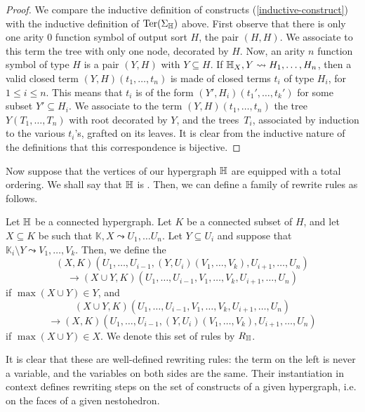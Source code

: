 \begin{proof}
  We compare the inductive definition of constructs (\cref{inductive-construct}) with the inductive definition of $\operatorname{Ter}(\Sigma_{\mathbb H})$ above.
  First observe that there is only one arity $0$ function symbol of output sort $H$, the pair $(H,H)$. 
  We associate to this term the tree with only one node, decorated by $H$.
  Now, an arity $n$ function symbol of type $H$ is a pair $(Y,H)$ with $Y \subseteq H$. 
  If ${\mathbb H}_X,Y \leadsto H_1,\ldots,H_n$, then a valid closed term $(Y,H)(t_1,\ldots,t_n)$ is made of closed terms $t_i$ of type $H_i$, for $1 \leq i \leq n$. 
  This means that $t_i$ is of the form $(Y',H_i)(t_1',\ldots,t_k')$ for some subset $Y' \subseteq H_i$. 
  We associate to the term $(Y,H)(t_1,\ldots,t_n)$ the tree $Y(T_1,\ldots,T_n)$ with root decorated by $Y$, and the trees~$T_i$, associated by induction to the various $t_i$'s, grafted on its leaves.
  It is clear from the inductive nature of the definitions that this correspondence is bijective.
\end{proof}

Now suppose that the vertices of our hypergraph ${\mathbb H}$ are equipped with a total ordering.
We shall say that ${\mathbb H}$ is .
Then, we can define a family of rewrite rules as follows.

\begin{definition} \label{def:rules}
  Let ${\mathbb H}$ be a connected hypergraph. 
  Let $K$ be a connected subset of $H$, and let $X \subseteq K$ be such that $\mathbb{K},X \leadsto U_1,\ldots U_n$.
  Let $Y \subseteq U_i$ and suppose that $\mathbb{K}_i\setminus Y \leadsto V_1,\ldots, V_k$. 
  Then, we define the 
  $$(X,K)(U_1,\ldots, U_{i-1},(Y,U_i)(V_1,\ldots, V_k),U_{i+1},\ldots,U_n)$$
  $$ \longrightarrow (X\cup Y,K)(U_1,\ldots,U_{i-1},V_1,\ldots, V_k,U_{i+1},\ldots,U_n)$$
  if $\max(X\cup Y)\in Y$, and 
  $$(X\cup Y,K)(U_1,\ldots,U_{i-1},V_1,\ldots, V_k,U_{i+1},\ldots,U_n)$$
  $$\longrightarrow (X,K)(U_1,\ldots, U_{i-1},(Y,U_i)(V_1,\ldots, V_k),U_{i+1},\ldots,U_n)$$
  if $\max(X\cup Y)\in X$.
  We denote this set of rules by $R_{\mathbb H}$.
\end{definition} 

It is clear that these are well-defined rewriting rules: the term on the left is never a variable, and the variables on both sides are the same.
Their instantiation in context defines rewriting steps on the set of constructs of a given hypergraph, i.e. on the faces of a given nestohedron.

